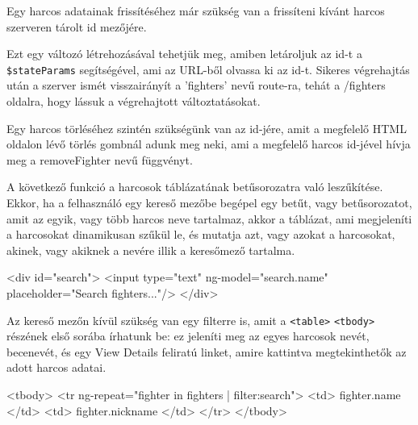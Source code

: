 Egy harcos adatainak frissítéséhez már szükség van a frissíteni kívánt harcos szerveren tárolt id mezőjére.


Ezt egy változó létrehozásával tehetjük meg, amiben letároljuk az id-t a 
\texttt{\$stateParams} segítségével, ami az URL-ből olvassa ki az id-t. Sikeres végrehajtás után a szerver ismét visszairányít a ’fighters’ nevű route-ra, tehát a /fighters oldalra, hogy lássuk a végrehajtott változtatásokat.

Egy harcos törléséhez szintén szükségünk van az id-jére, amit a megfelelő HTML oldalon lévő törlés gombnál adunk meg neki, ami a megfelelő harcos id-jével hívja meg a removeFighter nevű függvényt.


A következő funkció a harcosok táblázatának betűsorozatra való leszűkítése. Ekkor, ha a felhasználó egy kereső mezőbe begépel egy betűt, vagy betűsorozatot, amit az egyik, vagy több harcos neve tartalmaz, akkor a táblázat, ami megjeleníti a harcosokat dinamikusan szűkül le, és mutatja azt, vagy azokat a harcosokat, akinek, vagy akiknek a nevére illik a keresőmező tartalma.

\begin{cpp}
<div id="search">
  <input type="text" ng-model="search.name" 
  placeholder="Search fighters..."/>
</div>
\end{cpp}

Az kereső mezőn kívül szükség van egy filterre is, amit a \texttt{<table>} \texttt{<tbody>} részének első sorába írhatunk be: ez jeleníti meg az egyes harcosok nevét, becenevét, és egy View Details feliratú linket, amire kattintva megtekinthetők az adott harcos adatai.

\begin{cpp}
<tbody>
	<tr ng-repeat="fighter in fighters | filter:search">
		<td>{{ fighter.name }}</td>
        <td>{{ fighter.nickname }}</td>
	</tr>
</tbody>
\end{cpp}

